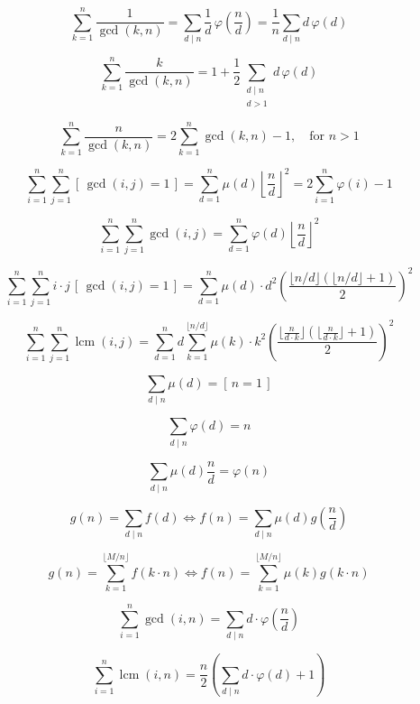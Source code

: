 
\[
\sum_{k=1}^{n} \frac{1}{\gcd(k,n)}
= \sum_{d \mid n} \frac{1}{d} \, \varphi\!\left( \frac{n}{d} \right)
= \frac{1}{n} \sum_{d \mid n} d \, \varphi(d)
\]

\[
\sum_{k=1}^{n} \frac{k}{\gcd(k,n)}
= 1 + \frac{1}{2} \sum_{\substack{d \mid n \\ d>1}} d \, \varphi(d)
\]

\[
\sum_{k=1}^{n} \frac{n}{\gcd(k,n)}
= 2 \sum_{k=1}^{n} \gcd(k,n) - 1, \quad \text{for } n > 1
\]

\[
\sum_{i=1}^{n} \sum_{j=1}^{n} [\,\gcd(i,j)=1\,]
= \sum_{d=1}^{n} \mu(d) \left\lfloor \frac{n}{d} \right\rfloor^2
= 2 \sum_{i=1}^{n} \varphi(i) - 1
\]

\[
\sum_{i=1}^{n} \sum_{j=1}^{n} \gcd(i,j)
= \sum_{d=1}^{n} \varphi(d) \left\lfloor \frac{n}{d} \right\rfloor^2
\]

\[
\sum_{i=1}^{n} \sum_{j=1}^{n} i \cdot j \, [\, \gcd(i,j)=1 \,]
= \sum_{d=1}^{n} \mu(d) \cdot d^2 \left( \frac{\lfloor n/d \rfloor (\lfloor n/d \rfloor + 1)}{2} \right)^2
\]

\[
\sum_{i=1}^{n} \sum_{j=1}^{n} \operatorname{lcm}(i,j)
= \sum_{d=1}^{n} d \sum_{k=1}^{\lfloor n/d \rfloor} \mu(k) \cdot k^2 \left( \frac{\lfloor \frac{n}{d \cdot k} \rfloor (\lfloor \frac{n}{d \cdot k} \rfloor + 1)}{2} \right)^2
\]


\[
\sum_{d \mid n} \mu(d) = [\,n=1\,]
\]

\[
\sum_{d \mid n} \varphi(d) = n
\]

\[
\sum_{d \mid n} \mu(d) \frac{n}{d} = \varphi(n)
\]

\[
g(n) = \sum_{d \mid n} f(d) \iff f(n) = \sum_{d \mid n} \mu(d) g\!\left(\frac{n}{d}\right)
\]

\[
g(n) = \sum_{k=1}^{\lfloor M/n \rfloor} f(k \cdot n) \iff f(n) = \sum_{k=1}^{\lfloor M/n \rfloor} \mu(k) g(k \cdot n)
\]


\[
\sum_{i=1}^{n} \gcd(i,n) = \sum_{d \mid n} d \cdot \varphi\!\left(\frac{n}{d}\right)
\]

\[
\sum_{i=1}^{n} \operatorname{lcm}(i,n) = \frac{n}{2} \left( \sum_{d \mid n} d \cdot \varphi(d) + 1 \right)
\]

